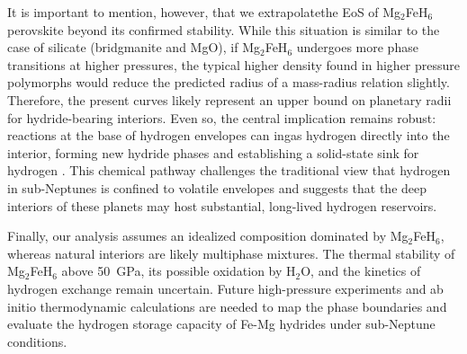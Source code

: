 \documentclass[draft,jgrga,12pt]{agujournal2019}
\begin{document}
It is important to mention, however, that we extrapolatethe EoS of Mg$_2$FeH$_6$ perovskite beyond its confirmed stability.
While this situation is similar to the case of silicate (bridgmanite and MgO), if Mg$_2$FeH$_6$ undergoes more phase transitions at higher pressures, the typical higher density found in higher pressure polymorphs would reduce the predicted radius of a mass-radius relation slightly.  
Therefore, the present curves likely represent an upper bound on planetary radii for hydride-bearing interiors. 
Even so, the central implication remains robust: reactions at the base of hydrogen envelopes can ingas hydrogen directly into the interior, forming new hydride phases and establishing a solid-state sink for hydrogen \cite{kim_stability_2023}. This chemical pathway challenges the traditional view that hydrogen in sub-Neptunes is confined to volatile envelopes and suggests that the deep interiors of these planets may host substantial, long-lived hydrogen reservoirs.


Finally, our analysis assumes an idealized composition dominated by Mg$_2$FeH$_6$, whereas natural interiors are likely multiphase mixtures. 
The thermal stability of Mg$_2$FeH$_6$ above 50~{GPa}, its possible oxidation by H$_2$O, and the kinetics of hydrogen exchange remain uncertain. Future high-pressure experiments and ab initio thermodynamic calculations are needed to map the phase boundaries and evaluate the hydrogen storage capacity of Fe-Mg hydrides under sub-Neptune conditions.


\clearpage




\end{document}
